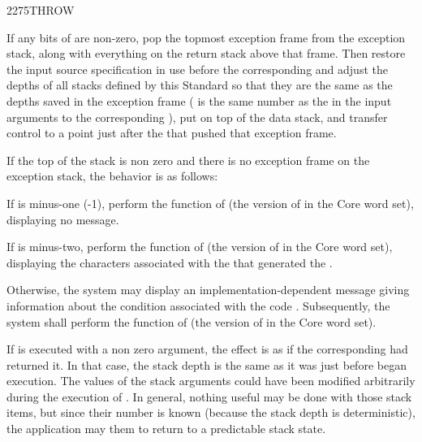 \begin{worddef}{2275}{THROW}
\item {}

	If any bits of  are non-zero, pop the topmost exception
	frame from the exception stack, along with everything on the
	return stack above that frame. Then restore the input source
	specification in use before the corresponding 
	and adjust the depths of all stacks defined by this Standard
	so that they are the same as the depths saved in the exception
	frame ( is the same number as the  in the input
	arguments to the corresponding ), put  on
	top of the data stack, and transfer control to a point just after
	the  that pushed that exception frame.

	If the top of the stack is non zero and there is no exception
	frame on the exception stack, the behavior is as follows:

	If  is minus-one (-1), perform the function of
	 (the version of  in
	the Core word set), displaying no message.

	If  is minus-two, perform the function of
	 (the version of 
	in the Core word set), displaying the characters 
	associated with the  that generated the
	.

	Otherwise, the system may display an implementation-dependent
	message giving information about the condition associated with
	the  code . Subsequently, the system shall
	perform the function of  (the version
	of  in the Core word set).

\see {}

	\begin{rationale} %
		If  is executed with a non zero argument, the effect
		is as if the corresponding  had returned it. In that
		case, the stack depth is the same as it was just before 
		began execution. The values of the  stack arguments could
		have been modified arbitrarily during the execution of .
		In general, nothing useful may be done with those stack items, but
		since their number is known (because the stack depth is deterministic),
		the application may  them to return to a predictable
		stack state.


\end{rationale}
\end{worddef}
